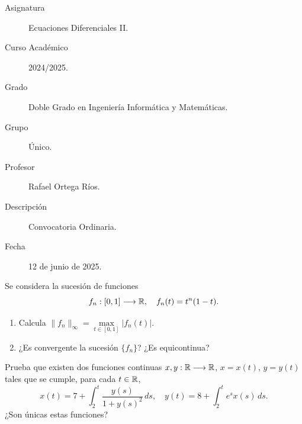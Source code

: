 \documentclass[12pt]{article}
\begin{document}

    
    

    \begin{description}
        \item[Asignatura] Ecuaciones Diferenciales II.
        \item[Curso Académico] 2024/2025.
        \item[Grado] Doble Grado en Ingeniería Informática y Matemáticas.
        \item[Grupo] Único.
        \item[Profesor] Rafael Ortega Ríos.
        \item[Descripción] Convocatoria Ordinaria.
        \item[Fecha] 12 de junio de 2025.
    \end{description}
    \newpage


    
    \begin{ejercicio}
        Se considera la sucesión de funciones
        \[
            f_n : \left[0, 1\right] \longrightarrow \mathbb{R}, \quad f_n(t) = t^n(1-t).
        \]
        \begin{enumerate}[label=\alph*)]
            \item Calcula $\|f_n\|_\infty = \max\limits_{t \in \left[0, 1\right]} |f_n(t)|$.
            \item ¿Es convergente la sucesión $\{f_n\}$? ¿Es equicontinua?
        \end{enumerate}
    \end{ejercicio}

    \begin{ejercicio}
        Prueba que existen dos funciones continuas $x, y : \mathbb{R} \longrightarrow \mathbb{R}$, $x = x(t)$, $y = y(t)$ tales que se cumple, para cada $t \in \mathbb{R}$,
        \[
            x(t) = 7 + \int_{2}^{t} \frac{y(s)}{1 + y(s)^2} \, ds, \quad y(t) = 8 + \int_{2}^{t} e^s x(s) \, ds.
        \]
        ¿Son únicas estas funciones?
    \end{ejercicio}
\end{document}
